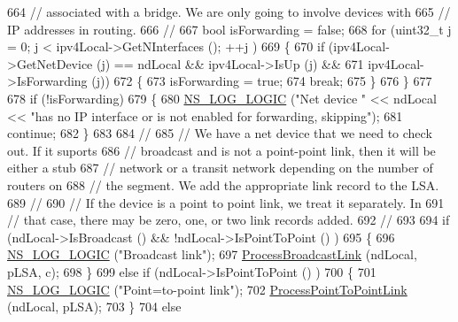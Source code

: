 \begin{DoxyCode}
664       \textcolor{comment}{// associated with a bridge.  We are only going to involve devices with }
665       \textcolor{comment}{// IP addresses in routing.}
666       \textcolor{comment}{//}
667       \textcolor{keywordtype}{bool} isForwarding = \textcolor{keyword}{false};
668       \textcolor{keywordflow}{for} (uint32\_t j = 0; j < ipv4Local->GetNInterfaces (); ++j )
669         \{
670           \textcolor{keywordflow}{if} (ipv4Local->GetNetDevice (j) == ndLocal && ipv4Local->IsUp (j) &&
671               ipv4Local->IsForwarding (j)) 
672             \{
673               isForwarding = \textcolor{keyword}{true};
674               \textcolor{keywordflow}{break};
675             \}
676         \}
677 
678       \textcolor{keywordflow}{if} (!isForwarding)
679         \{
680           \hyperlink{group__logging_ga88acd260151caf2db9c0fc84997f45ce}{NS\_LOG\_LOGIC} (\textcolor{stringliteral}{"Net device "} << ndLocal << \textcolor{stringliteral}{"has no IP interface or is not enabled for
       forwarding, skipping"});
681           \textcolor{keywordflow}{continue};
682         \}
683 
684       \textcolor{comment}{//}
685       \textcolor{comment}{// We have a net device that we need to check out.  If it suports }
686       \textcolor{comment}{// broadcast and is not a point-point link, then it will be either a stub }
687       \textcolor{comment}{// network or a transit network depending on the number of routers on}
688       \textcolor{comment}{// the segment.  We add the appropriate link record to the LSA.}
689       \textcolor{comment}{//}
690       \textcolor{comment}{// If the device is a point to point link, we treat it separately.  In}
691       \textcolor{comment}{// that case, there may be zero, one, or two link records added.}
692       \textcolor{comment}{//}
693 
694       \textcolor{keywordflow}{if} (ndLocal->IsBroadcast () && !ndLocal->IsPointToPoint () )
695         \{
696           \hyperlink{group__logging_ga88acd260151caf2db9c0fc84997f45ce}{NS\_LOG\_LOGIC} (\textcolor{stringliteral}{"Broadcast link"});
697           \hyperlink{classns3_1_1GlobalRouter_af981be58153ef32690b434072cd3205b}{ProcessBroadcastLink} (ndLocal, pLSA, c);
698         \}
699       \textcolor{keywordflow}{else} \textcolor{keywordflow}{if} (ndLocal->IsPointToPoint () )
700         \{
701           \hyperlink{group__logging_ga88acd260151caf2db9c0fc84997f45ce}{NS\_LOG\_LOGIC} (\textcolor{stringliteral}{"Point=to-point link"});
702           \hyperlink{classns3_1_1GlobalRouter_adaf99c499d6e42e450a31b53a8019b14}{ProcessPointToPointLink} (ndLocal, pLSA);
703         \}
704       \textcolor{keywordflow}{else}

\end{DoxyCode}

